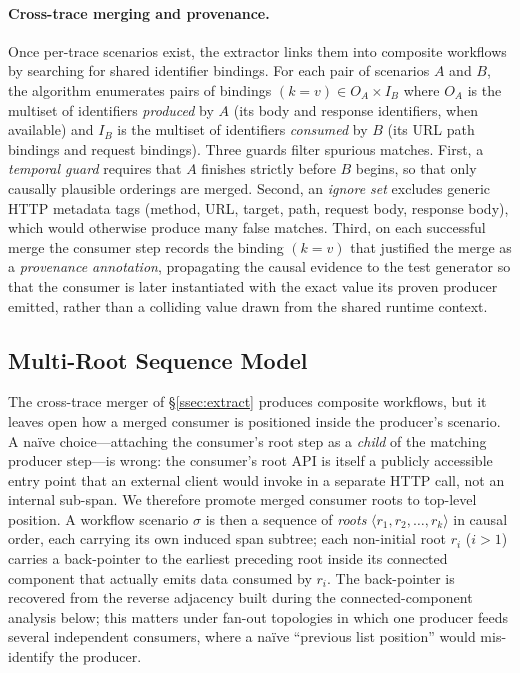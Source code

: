 \documentclass[conference]{IEEEtran}
\begin{document}
\paragraph{Cross-trace merging and provenance.}
Once per-trace scenarios exist, the extractor links them into composite workflows by searching for shared identifier bindings. For each pair of scenarios $A$ and $B$, the algorithm enumerates pairs of bindings $(k{=}v) \in O_A \times I_B$ where $O_A$ is the multiset of identifiers \emph{produced} by $A$ (its body and response identifiers, when available) and $I_B$ is the multiset of identifiers \emph{consumed} by $B$ (its URL path bindings and request bindings). Three guards filter spurious matches. First, a \emph{temporal guard} requires that $A$ finishes strictly before $B$ begins, so that only causally plausible orderings are merged. Second, an \emph{ignore set} excludes generic HTTP metadata tags (method, URL, target, path, request body, response body), which would otherwise produce many false matches. Third, on each successful merge the consumer step records the binding $(k{=}v)$ that justified the merge as a \emph{provenance annotation}, propagating the causal evidence to the test generator so that the consumer is later instantiated with the exact value its proven producer emitted, rather than a colliding value drawn from the shared runtime context.

\subsection{Multi-Root Sequence Model}
\label{ssec:multiroot}

The cross-trace merger of \S\ref{ssec:extract} produces composite workflows, but it leaves open how a merged consumer is positioned inside the producer's scenario. A na\"ive choice---attaching the consumer's root step as a \emph{child} of the matching producer step---is wrong: the consumer's root API is itself a publicly accessible entry point that an external client would invoke in a separate HTTP call, not an internal sub-span. We therefore promote merged consumer roots to top-level position. A workflow scenario $\sigma$ is then a sequence of \emph{roots} $\langle r_1, r_2, \ldots, r_k\rangle$ in causal order, each carrying its own induced span subtree; each non-initial root $r_i$ ($i > 1$) carries a back-pointer to the earliest preceding root inside its connected component that actually emits data consumed by $r_i$. The back-pointer is recovered from the reverse adjacency built during the connected-component analysis below; this matters under fan-out topologies in which one producer feeds several independent consumers, where a na\"ive ``previous list position'' would mis-identify the producer.
\end{document}
